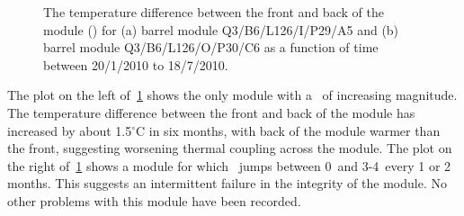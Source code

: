 \begin{figure}[h]
 	\centering
  \caption[The temperature difference between the front and back of the module
  (\deltat) for barrel module Q3/B6/L126/I/P29/A5 and barrel module
  Q3/B6/L126/O/P30/C6 as a function of time between 20/1/2010 to
  18/7/2010.]{The temperature difference between the front and back of the module
  (\deltat) for (a) barrel module Q3/B6/L126/I/P29/A5 and (b) barrel module
  Q3/B6/L126/O/P30/C6 as a function of time between 20/1/2010 to
  18/7/2010.}
	\label{fig:pm_ev_dt}
\end{figure}

The plot on the left of~\ref{fig:pm_ev_dt} shows the only module with a \deltat\
of increasing magnitude. The temperature difference between the front and back
of the module has increased by about 1.5$^\circ$C in six months, with back of
the module warmer than the front, suggesting worsening thermal coupling across
the module. The plot on the right of~\ref{fig:pm_ev_dt} shows a
module for which \deltat\ jumps between 0\dc\ and 3-4\dc\ every 1 or 2 months.
This suggests an intermittent failure in the integrity of the module. No other problems
with this module have been recorded.

